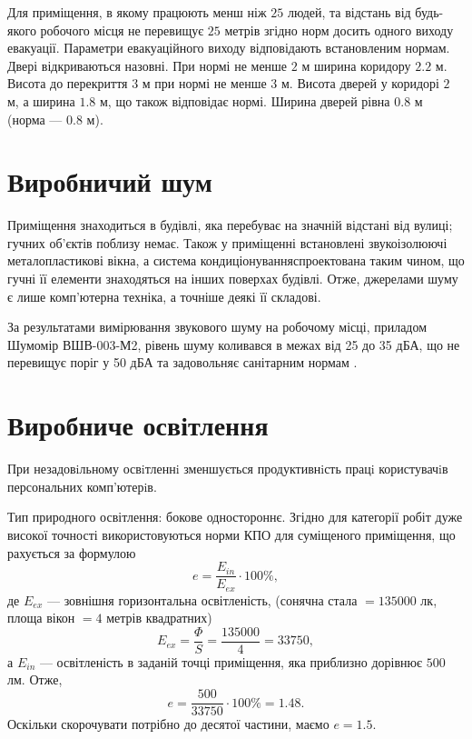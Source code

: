 Для приміщення, в якому працюють менш ніж $25$ людей, та відстань від будь-якого
робочого місця не перевищує $25$ метрів згідно норм досить одного виходу
евакуації. Параметри евакуаційного виходу відповідають встановленим нормам.
Двері відкриваються назовні.
При нормі не менше $2$ м ширина коридору $2.2$ м.
Висота до перекриття $3$ м при нормі не менше $3$ м.
Висота дверей у коридорі $2$ м, а ширина $1.8$ м, що також відповідає нормі.
Ширина дверей рівна $0.8$ м  (норма --- $0.8$ м).

\section{Виробничий шум}

Приміщення знаходиться в будівлі, яка перебуває на значній відстані від вулиці;
гучних об’єктів поблизу немає.
Також у приміщенні встановлені звукоізолюючі металопластикові вікна,
а система кондиціонуванняспроектована таким чином,
що гучні її елементи знаходяться на інших поверхах будівлі.
Отже, джерелами шуму є лише комп’ютерна техніка, а точніше деякі її складові.

За результатами вимірювання звукового шуму на робочому місці,
приладом Шумомір ВШВ-003-М2, рівень шуму коливався в межах від 25 до 35 дБА, 
що не перевищує поріг у 50 дБА та задовольняє санітарним нормам \cite{DSanPiN}.

\section{Виробниче освітлення}

При незадовiльному освiтленнi зменшується продуктивнiсть працi
користувачiв персональних комп’ютерiв.

Тип природного освітлення: бокове одностороннє.
Згідно \cite{DBN} для категорії робіт дуже високої точності
використовуються норми КПО для суміщеного приміщення, що рахується
за формулою
\begin{equation*}
  e = \frac{E_{in}}{E_{ex}} \cdot 100\%,
\end{equation*}
де $E_{ex}$ --- зовнішня горизонтальна освітленість,
(сонячна стала $= 135000$ лк, площа вікон $=4$ метрів квадратних)
\begin{equation*}
  E_{ex} = \frac{\Phi}{S} = \frac{135000}{4} = 33750,
\end{equation*}
а $E_{in}$ --- освітленість в заданій точці приміщення,
яка приблизно дорівнює $500$ лм.
Отже,
\begin{equation*}
  e = \frac{500}{33750} \cdot 100\% = 1.48.
\end{equation*}
Оскільки скорочувати потрібно до десятої частини, маємо $e=1.5$.

